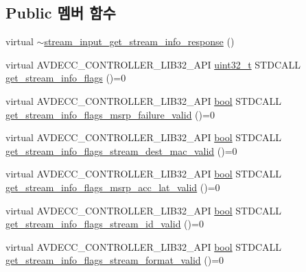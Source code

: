 \subsection*{Public 멤버 함수}
\begin{DoxyCompactItemize}
\item 
virtual \hyperlink{classavdecc__lib_1_1stream__input__get__stream__info__response_a349613749ec50cb4a17d161d3ec0a989}{$\sim$stream\+\_\+input\+\_\+get\+\_\+stream\+\_\+info\+\_\+response} ()
\item 
virtual A\+V\+D\+E\+C\+C\+\_\+\+C\+O\+N\+T\+R\+O\+L\+L\+E\+R\+\_\+\+L\+I\+B32\+\_\+\+A\+PI \hyperlink{parse_8c_a6eb1e68cc391dd753bc8ce896dbb8315}{uint32\+\_\+t} S\+T\+D\+C\+A\+LL \hyperlink{classavdecc__lib_1_1stream__input__get__stream__info__response_a24ae25b3a229f07ea76104024141ca84}{get\+\_\+stream\+\_\+info\+\_\+flags} ()=0
\item 
virtual A\+V\+D\+E\+C\+C\+\_\+\+C\+O\+N\+T\+R\+O\+L\+L\+E\+R\+\_\+\+L\+I\+B32\+\_\+\+A\+PI \hyperlink{avb__gptp_8h_af6a258d8f3ee5206d682d799316314b1}{bool} S\+T\+D\+C\+A\+LL \hyperlink{classavdecc__lib_1_1stream__input__get__stream__info__response_a66f8db5ffff809dc5ae3b96c8d43eaf5}{get\+\_\+stream\+\_\+info\+\_\+flags\+\_\+msrp\+\_\+failure\+\_\+valid} ()=0
\item 
virtual A\+V\+D\+E\+C\+C\+\_\+\+C\+O\+N\+T\+R\+O\+L\+L\+E\+R\+\_\+\+L\+I\+B32\+\_\+\+A\+PI \hyperlink{avb__gptp_8h_af6a258d8f3ee5206d682d799316314b1}{bool} S\+T\+D\+C\+A\+LL \hyperlink{classavdecc__lib_1_1stream__input__get__stream__info__response_a1089d406a845dc42da30dbb1cd627f09}{get\+\_\+stream\+\_\+info\+\_\+flags\+\_\+stream\+\_\+dest\+\_\+mac\+\_\+valid} ()=0
\item 
virtual A\+V\+D\+E\+C\+C\+\_\+\+C\+O\+N\+T\+R\+O\+L\+L\+E\+R\+\_\+\+L\+I\+B32\+\_\+\+A\+PI \hyperlink{avb__gptp_8h_af6a258d8f3ee5206d682d799316314b1}{bool} S\+T\+D\+C\+A\+LL \hyperlink{classavdecc__lib_1_1stream__input__get__stream__info__response_a54f69ff970809ded4916bb29b7945c14}{get\+\_\+stream\+\_\+info\+\_\+flags\+\_\+msrp\+\_\+acc\+\_\+lat\+\_\+valid} ()=0
\item 
virtual A\+V\+D\+E\+C\+C\+\_\+\+C\+O\+N\+T\+R\+O\+L\+L\+E\+R\+\_\+\+L\+I\+B32\+\_\+\+A\+PI \hyperlink{avb__gptp_8h_af6a258d8f3ee5206d682d799316314b1}{bool} S\+T\+D\+C\+A\+LL \hyperlink{classavdecc__lib_1_1stream__input__get__stream__info__response_aac97139921d5f55f8f166b8f013766a1}{get\+\_\+stream\+\_\+info\+\_\+flags\+\_\+stream\+\_\+id\+\_\+valid} ()=0
\item 
virtual A\+V\+D\+E\+C\+C\+\_\+\+C\+O\+N\+T\+R\+O\+L\+L\+E\+R\+\_\+\+L\+I\+B32\+\_\+\+A\+PI \hyperlink{avb__gptp_8h_af6a258d8f3ee5206d682d799316314b1}{bool} S\+T\+D\+C\+A\+LL \hyperlink{classavdecc__lib_1_1stream__input__get__stream__info__response_aea35630b9925143d69bb4997c392b0d5}{get\+\_\+stream\+\_\+info\+\_\+flags\+\_\+stream\+\_\+format\+\_\+valid} ()=0

\end{DoxyCompactItemize}

